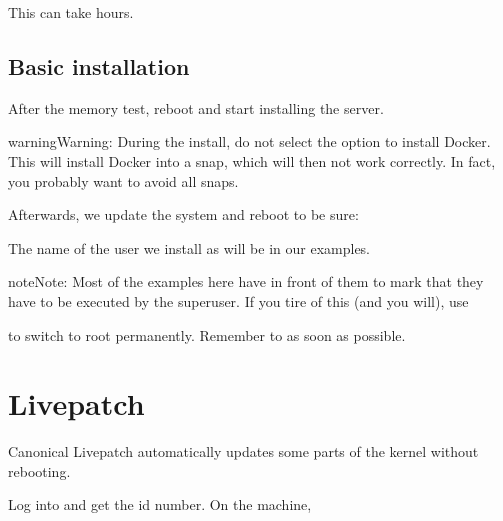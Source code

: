 \documentclass[a4paper,10pt,english]{sphinxmanual}
\begin{document}
This can take hours.


\section{Basic installation}
\label{\detokenize{os:basic-installation}}
After the memory test, reboot and start installing the server.

\begin{sphinxadmonition}{warning}{Warning:}
During the install, do not select the option to install Docker.
This will install Docker into a snap, which will then not work correctly.
In fact, you probably want to avoid all snaps.
\end{sphinxadmonition}

Afterwards, we update the system and reboot to be sure:

\begin{sphinxVerbatim}[commandchars=\\\{\}]
  
  
 
\end{sphinxVerbatim}

The name of the user we install as will be  in our examples.

\begin{sphinxadmonition}{note}{Note:}
Most of the examples here have  in front of them to mark that
they have to be executed by the superuser. If you tire of this (and you
will), use

\begin{sphinxVerbatim}[commandchars=\\\{\}]
  
\end{sphinxVerbatim}

to switch to root permanently. Remember to  as soon as possible.
\end{sphinxadmonition}


\chapter{Livepatch}
\label{\detokenize{livepatch:livepatch}}\label{\detokenize{livepatch::doc}}
Canonical Livepatch automatically updates some parts of the kernel without
rebooting.

Log into  and get the id number. On the machine,
\end{document}
